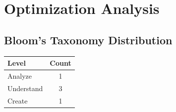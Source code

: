 \documentclass[12pt,a4paper]{article}%
\begin{document}
%
\section{Optimization Analysis}%
\label{sec:OptimizationAnalysis}%
\subsection{Bloom's Taxonomy Distribution}%
\label{subsec:BloomsTaxonomyDistribution}%
\begin{tabular}{|l|c|}%
\hline%
\textbf{Level}&\textbf{Count}\\%
\hline%
Analyze&1\\%
\hline%
Understand&3\\%
\hline%
Create&1\\%
\hline%
\end{tabular}

%
\end{document}

